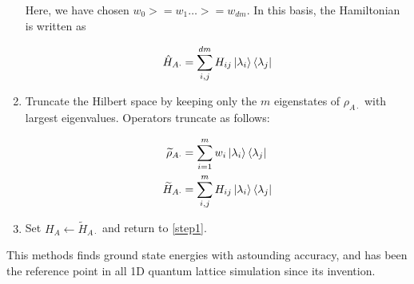 \begin{enumerate}
  Here, we have chosen $w_0 >= w_1 \ldots >= w_{d m}$. In this basis, the Hamiltonian is written as

  \begin{equation}
    \hat{H}_{A \cdot} = \sum_{i, j}^{d m} H_{ij} \ket{\lambda_i}\bra{\lambda_j}
  \end{equation}

  \item Truncate the Hilbert space by keeping only the $m$ eigenstates of
  $\rho_{A \cdot}$ with largest eigenvalues. Operators truncate as follows:

  \begin{align}
    \widetilde{\rho}_{A \cdot} & = \sum_{i = 1}^{m} w_i \ket{\lambda_i}\bra{\lambda_j} \\
    \widetilde{H}_{A \cdot} & = \sum_{i, j}^{m} H_{ij} \ket{\lambda_i}\bra{\lambda_j}
  \end{align}

  \item Set $H_{A} \leftarrow \widetilde{H}_{A \cdot}$ and return to \ref{step1}.

\end{enumerate}

This methods finds ground state energies with astounding accuracy, and has been
the reference point in all 1D quantum lattice simulation since its invention.
